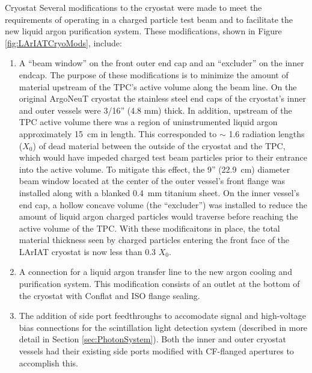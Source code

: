 \begin{subsubsection}{Cryostat}
Several modifications to the cryostat were made to meet the requirements of operating in a charged particle test beam and to facilitate the new liquid argon purification system. These modifications, shown in Figure \ref{fig:LArIATCryoMods}, include:
\begin{enumerate}[label=\roman*),topsep=0pt,itemsep=-1ex,partopsep=1ex,parsep=1ex]
\item A ``beam window'' on the front outer end cap and an ``excluder'' on the inner endcap.  The purpose of these modifications is to minimize the amount of material upstream of the TPC's active volume along the beam line.  On the original ArgoNeuT cryostat the stainless steel end caps of the cryostat's inner and outer vessels were 3/16'' (4.8 mm) thick. In addition, upstream of the TPC active volume there was a region of uninstrumented liquid argon approximately 15~cm in length. This corresponded to $\sim$ 1.6 radiation lengths ($X_{0}$) of dead material between the outside of the cryostat and the TPC, which would have impeded charged test beam particles prior to their entrance into the active volume.  To mitigate this effect, the 9'' (22.9~cm) diameter beam window located at the center of the outer vessel's front flange was installed along with a blanked 0.4~mm titanium sheet. On the inner vessel's end cap, a hollow concave volume (the ``excluder'') was installed to reduce the amount of liquid argon charged particles would traverse before reaching the active volume of the TPC. With these modificaitons in place, the total material thickness seen by charged particles entering the front face of the LArIAT cryostat is now less than 0.3 $X_{0}$. 
\item A connection for a liquid argon transfer line to the new argon cooling and purification system. This modification consists of an outlet at the bottom of the cryostat with Conflat and ISO flange sealing. 
\item The addition of side port feedthroughs to accomodate signal and high-voltage bias connections for the scintillation light detection system (described in more detail in Section \ref{sec:PhotonSystem}). Both the inner and outer cryostat vessels had their existing side ports modified with CF-flanged apertures to accomplish this.
\end{enumerate}




\end{subsubsection}
